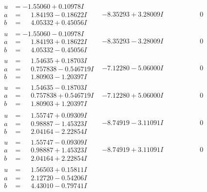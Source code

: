 \documentclass[1p]{elsarticle_modified}
\theoremstyle{definition}
\begin{document}
$$\begin{array}{c|c|c}
\begin{aligned}
u &= -1.55060 + 0.10978 I \\
a &= \phantom{-}1.84193 - 0.18622 I \\
b &= \phantom{-}4.05332 + 0.45056 I\end{aligned}
 & -8.35293 + 3.28009 I & \phantom{-0.000000 } 0 \\ \hline\begin{aligned}
u &= -1.55060 - 0.10978 I \\
a &= \phantom{-}1.84193 + 0.18622 I \\
b &= \phantom{-}4.05332 - 0.45056 I\end{aligned}
 & -8.35293 - 3.28009 I & \phantom{-0.000000 } 0 \\ \hline\begin{aligned}
u &= \phantom{-}1.54635 + 0.18703 I \\
a &= \phantom{-}0.757838 - 0.546719 I \\
b &= \phantom{-}1.80903 - 1.20397 I\end{aligned}
 & -7.12280 - 5.06000 I & \phantom{-0.000000 } 0 \\ \hline\begin{aligned}
u &= \phantom{-}1.54635 - 0.18703 I \\
a &= \phantom{-}0.757838 + 0.546719 I \\
b &= \phantom{-}1.80903 + 1.20397 I\end{aligned}
 & -7.12280 + 5.06000 I & \phantom{-0.000000 } 0 \\ \hline\begin{aligned}
u &= \phantom{-}1.55747 + 0.09309 I \\
a &= \phantom{-}0.98887 - 1.45323 I \\
b &= \phantom{-}2.04164 - 2.22854 I\end{aligned}
 & -8.74919 - 3.11091 I & \phantom{-0.000000 } 0 \\ \hline\begin{aligned}
u &= \phantom{-}1.55747 - 0.09309 I \\
a &= \phantom{-}0.98887 + 1.45323 I \\
b &= \phantom{-}2.04164 + 2.22854 I\end{aligned}
 & -8.74919 + 3.11091 I & \phantom{-0.000000 } 0 \\ \hline\begin{aligned}
u &= \phantom{-}1.56503 + 0.15811 I \\
a &= \phantom{-}2.12720 - 0.54206 I \\
b &= \phantom{-}4.43010 - 0.79741 I\end{aligned}

\end{array}$$
\end{document}
